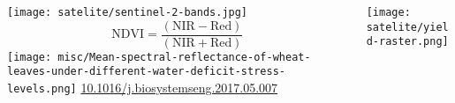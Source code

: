
\begin{frame}
      \begin{columns}
            \begin{column}{0.6\textwidth}
                  \begin{center}
                        \texttt{[image: satelite/sentinel-2-bands.jpg]}
                        $$\mathrm{NDVI}=\frac{(\mathrm{NIR}-\mathrm{Red})}{(\mathrm{NIR}+\mathrm{Red})}$$
                        \texttt{[image: misc/Mean-spectral-reflectance-of-wheat-leaves-under-different-water-deficit-stress-levels.png]}
                        \tiny \url{10.1016/j.biosystemseng.2017.05.007}
                  \end{center}
            \end{column}
            \begin{column}{0.35\textwidth}  %
                  \begin{center}
                        \texttt{[image: satelite/yield-raster.png]}
                  \end{center}
            \end{column}
      \end{columns}
\end{frame}